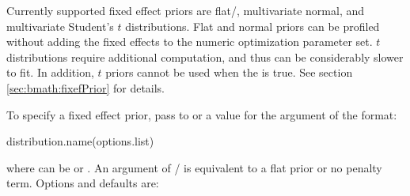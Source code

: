 \documentclass[article,shortnames]{jss}
\begin{document}
Currently supported fixed effect priors are flat/, multivariate
normal, and multivariate Student's $t$ distributions. Flat and normal
priors can be profiled without adding the fixed effects to the numeric
optimization parameter set. $t$ distributions require additional computation, 
and thus can be considerably slower to fit. In addition, $t$ priors
cannot be used when the  is true. See
section \ref{sec:bmath:fixefPrior} for details.

To specify a fixed effect prior, pass to  or 
a value for the  argument of the format:

\begin{Code}
  distribution.name(options.list)
\end{Code}

\noindent where  can be  or
. An argument of / is equivalent to a
flat prior or no
penalty term. Options and defaults are:
\end{document}
